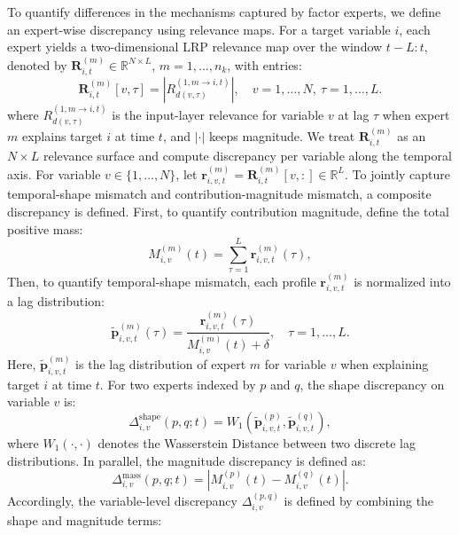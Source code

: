﻿\documentclass[journal]{IEEEtran}
\begin{document}
To quantify differences in the mechanisms captured by factor experts, we define an expert-wise discrepancy using relevance maps. For a target variable $i$, each expert yields a two-dimensional LRP relevance map over the window $t\!-\!L:t$, denoted by $\mathbf{R}_{i,t}^{(m)}\in\mathbb{R}^{N\times L}$, $m=1,\ldots,n_k$, with entries:
\begin{equation}
\mathbf{R}_{i,t}^{(m)}[v,\tau]=\left|R_{d(v,\tau)}^{(1,m\rightarrow i,t)}\right|,\quad v=1,\ldots,N,\ \tau=1,\ldots,L.
\end{equation}
where $R_{d(v,\tau)}^{(1,m\rightarrow i,t)}$ is the input-layer relevance for variable $v$ at lag $\tau$ when expert $m$ explains target $i$ at time $t$, and $|\cdot|$ keeps magnitude. We treat $\mathbf{R}_{i,t}^{(m)}$ as an $N\times L$ relevance surface and compute discrepancy per variable along the temporal axis. For variable $v\in\{1,\ldots,N\}$, let $\mathbf{r}_{i,v,t}^{(m)}=\mathbf{R}_{i,t}^{(m)}[v,:]\in\mathbb{R}^{L}$.
To jointly capture temporal-shape mismatch and contribution-magnitude mismatch, a composite discrepancy is defined. First, to quantify contribution magnitude, define the total positive mass:
\begin{equation}
M_{i,v}^{(m)}(t)=\sum_{\tau=1}^{L}\mathbf{r}_{i,v,t}^{(m)}(\tau),
\end{equation}
Then, to quantify temporal-shape mismatch, each profile $\mathbf{r}_{i,v,t}^{(m)}$ is normalized into a lag distribution:
\begin{equation}
\tilde{\mathbf{p}}_{i,v,t}^{(m)}(\tau)=\frac{\mathbf{r}_{i,v,t}^{(m)}(\tau)}{M_{i,v}^{(m)}(t)+\delta},\quad \tau=1,\ldots,L.
\end{equation}
Here, $\tilde{\mathbf{p}}_{i,v,t}^{(m)}$ is the lag distribution of expert $m$ for variable $v$ when explaining target $i$ at time $t$.
For two experts indexed by $p$ and $q$, the shape discrepancy on variable $v$ is:
\begin{equation}
\Delta_{i,v}^{\mathrm{shape}}(p,q;t)=W_1\!\left(\tilde{\mathbf{p}}_{i,v,t}^{(p)},\tilde{\mathbf{p}}_{i,v,t}^{(q)}\right),
\end{equation}
where $W_1(\cdot,\cdot)$ denotes the Wasserstein Distance between two discrete lag distributions. In parallel, the magnitude discrepancy is defined as:
\begin{equation}
\Delta_{i,v}^{\mathrm{mass}}(p,q;t)=\left|M_{i,v}^{(p)}(t)-M_{i,v}^{(q)}(t)\right|.
\end{equation}
Accordingly, the variable-level discrepancy $\Delta_{i,v}^{(p,q)}$ is defined by combining the shape and magnitude terms:
\end{document}
